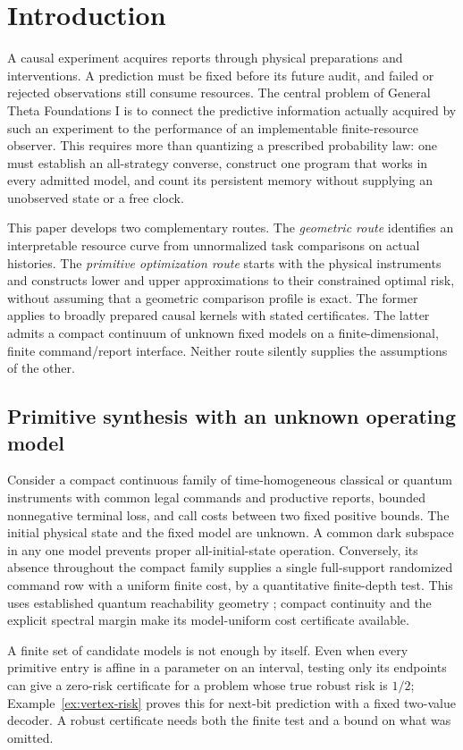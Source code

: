 \section{Introduction}
A causal experiment acquires reports through physical preparations and interventions. A prediction must be fixed before its future audit, and failed or rejected observations still consume resources. The central problem of General Theta Foundations I is to connect the predictive information actually acquired by such an experiment to the performance of an implementable finite-resource observer. This requires more than quantizing a prescribed probability law: one must establish an all-strategy converse, construct one program that works in every admitted model, and count its persistent memory without supplying an unobserved state or a free clock.

This paper develops two complementary routes. The \emph{geometric route} identifies an interpretable resource curve from unnormalized task comparisons on actual histories. The \emph{primitive optimization route} starts with the physical instruments and constructs lower and upper approximations to their constrained optimal risk, without assuming that a geometric comparison profile is exact. The former applies to broadly prepared causal kernels with stated certificates. The latter admits a compact continuum of unknown fixed models on a finite-dimensional, finite command/report interface. Neither route silently supplies the assumptions of the other.

\subsection*{Primitive synthesis with an unknown operating model}
Consider a compact continuous family of time-homogeneous classical or quantum instruments with common legal commands and productive reports, bounded nonnegative terminal loss, and call costs between two fixed positive bounds. The initial physical state and the fixed model are unknown. A common dark subspace in any one model prevents proper all-initial-state operation. Conversely, its absence throughout the compact family supplies a single full-support randomized command row with a uniform finite cost, by a quantitative finite-depth test. This uses established quantum reachability geometry \cite{Ying14pre}; compact continuity and the explicit spectral margin make its model-uniform cost certificate available.

A finite set of candidate models is not enough by itself. Even when every primitive entry is affine in a parameter on an interval, testing only its endpoints can give a zero-risk certificate for a problem whose true robust risk is $1/2$; Example~\ref{ex:vertex-risk} proves this for next-bit prediction with a fixed two-value decoder. A robust certificate needs both the finite test and a bound on what was omitted.

